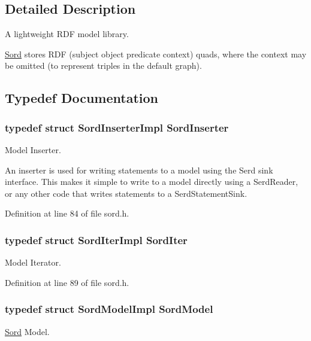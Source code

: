 \subsection{Detailed Description}
A lightweight R\+DF model library.

\hyperlink{namespace_sord}{Sord} stores R\+DF (subject object predicate context) quads, where the context may be omitted (to represent triples in the default graph). 

\subsection{Typedef Documentation}
\subsubsection[{\texorpdfstring{Sord\+Inserter}{SordInserter}}]{\setlength{\rightskip}{0pt plus 5cm}typedef struct {\bf Sord\+Inserter\+Impl} {\bf Sord\+Inserter}}\hypertarget{group__sord_ga766743eaebfadb5a5a5d94af6226eb75}{}\label{group__sord_ga766743eaebfadb5a5a5d94af6226eb75}
Model Inserter.

An inserter is used for writing statements to a model using the Serd sink interface. This makes it simple to write to a model directly using a Serd\+Reader, or any other code that writes statements to a Serd\+Statement\+Sink. 

Definition at line 84 of file sord.\+h.

\subsubsection[{\texorpdfstring{Sord\+Iter}{SordIter}}]{\setlength{\rightskip}{0pt plus 5cm}typedef struct {\bf Sord\+Iter\+Impl} {\bf Sord\+Iter}}\hypertarget{group__sord_ga59314650e0ab9b1cdeebc0bf7a0419fa}{}\label{group__sord_ga59314650e0ab9b1cdeebc0bf7a0419fa}
Model Iterator. 

Definition at line 89 of file sord.\+h.

\subsubsection[{\texorpdfstring{Sord\+Model}{SordModel}}]{\setlength{\rightskip}{0pt plus 5cm}typedef struct {\bf Sord\+Model\+Impl} {\bf Sord\+Model}}\hypertarget{group__sord_gaea018cfebfedd10280b1d8dd6d650a28}{}\label{group__sord_gaea018cfebfedd10280b1d8dd6d650a28}
\hyperlink{namespace_sord}{Sord} Model.

